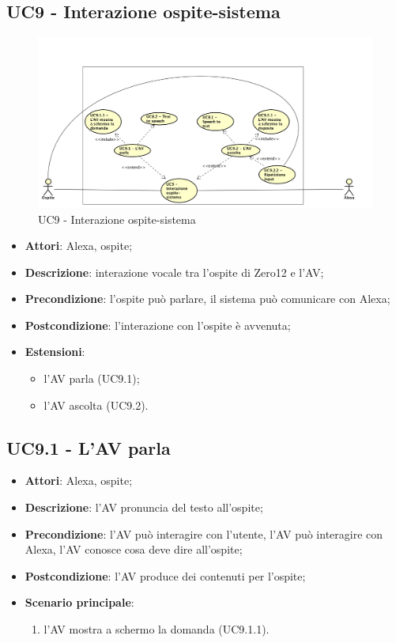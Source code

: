 \documentclass[../AnalisiDeiRequisiti.tex]{subfiles}
\begin{document}
\subsection{UC9 - Interazione ospite-sistema}
\begin{figure}[!h]
	\centering
	\includegraphics[width=\textwidth]{UseCases/UC9-InterazioneOspiteSistema/UC9.png}
	\caption{UC9 - Interazione ospite-sistema}
\end{figure}	
\label{sssec:UC9}
\begin{itemize} 
\item \textbf{Attori}: Alexa, ospite;
\item \textbf{Descrizione}: interazione vocale tra l'ospite di Zero12 e l'AV;
\item \textbf{Precondizione}: l'ospite può parlare, il sistema può comunicare con Alexa;
\item \textbf{Postcondizione}: l'interazione con l'ospite è avvenuta;
\item \textbf{Estensioni}:\begin{itemize}\item l'AV parla (UC9.1);\item l'AV ascolta (UC9.2).\end{itemize}
\end{itemize} 
\subsection{UC9.1 - L'AV parla} 
\label{sssec:UC9.1} 
\begin{itemize} 
\item \textbf{Attori}: Alexa, ospite;
\item \textbf{Descrizione}: l'AV pronuncia del testo all'ospite;
\item \textbf{Precondizione}: l'AV può interagire con l'utente, l'AV può interagire con Alexa, l'AV conosce cosa deve dire all'ospite;
\item \textbf{Postcondizione}: l'AV produce dei contenuti per l'ospite;
\item \textbf{Scenario principale}: \begin{enumerate}\item l'AV mostra a schermo la domanda (UC9.1.1). 
 \end{enumerate}
\end{itemize} 
\end{document}
